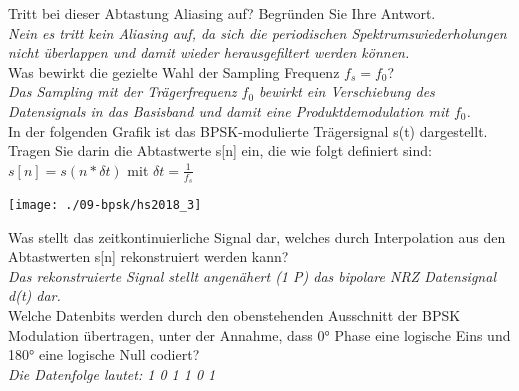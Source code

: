 Tritt bei dieser Abtastung Aliasing auf? Begründen Sie Ihre Antwort.\\
\textit{Nein es tritt kein Aliasing auf, da sich die periodischen Spektrumswiederholungen nicht überlappen und damit wieder herausgefiltert werden können.}\\

Was bewirkt die gezielte Wahl der Sampling Frequenz $f_s = f_0$?\\
\textit{Das Sampling mit der Trägerfrequenz $f_0$ bewirkt ein Verschiebung des Datensignals in das Basisband und damit eine Produktdemodulation mit $f_0$.}\\

In der folgenden Grafik ist das BPSK-modulierte Trägersignal s(t) dargestellt. Tragen Sie darin die Abtastwerte s[n] ein, die wie folgt definiert sind:\\
$s[n]=s(n*\delta t)$ mit $\delta t=\frac{1}{f_s}$
\begin{center}
    \vspace{-8pt}
    \texttt{[image: ./09-bpsk/hs2018\_3]}
    \vspace{-8pt}
\end{center}

Was stellt das zeitkontinuierliche Signal dar, welches durch Interpolation aus den Abtastwerten s[n] rekonstruiert werden kann?\\
\textit{Das rekonstruierte Signal stellt angenähert (1 P) das bipolare NRZ Datensignal d(t) dar.}\\

Welche Datenbits werden durch den obenstehenden Ausschnitt der BPSK Modulation übertragen, unter der Annahme, dass 0° Phase eine logische Eins und 180° eine logische
Null codiert?\\
\textit{Die Datenfolge lautet: 1 0 1 1 0 1}


